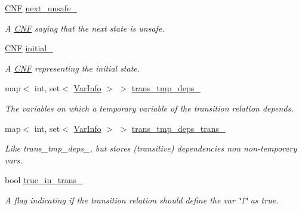 \begin{DoxyCompactItemize}
\hyperlink{classCNF}{C\-N\-F} \hyperlink{classAIG2CNF_a0430b9b4ff38a7b0ae339fb0abd191c9}{next\-\_\-unsafe\-\_\-}
\begin{DoxyCompactList}\small\item\em A \hyperlink{classCNF}{C\-N\-F} saying that the next state is unsafe. \end{DoxyCompactList}\item 
\hyperlink{classCNF}{C\-N\-F} \hyperlink{classAIG2CNF_a83d0b27b61d672ecf2bd007e0d473439}{initial\-\_\-}
\begin{DoxyCompactList}\small\item\em A \hyperlink{classCNF}{C\-N\-F} representing the initial state. \end{DoxyCompactList}\item 
map$<$ int, set$<$ \hyperlink{classVarInfo}{Var\-Info} $>$ $>$ \hyperlink{classAIG2CNF_a8617860055dfa8cbcc1f572676f57b84}{trans\-\_\-tmp\-\_\-deps\-\_\-}
\begin{DoxyCompactList}\small\item\em The variables on which a temporary variable of the transition relation depends. \end{DoxyCompactList}\item 
map$<$ int, set$<$ \hyperlink{classVarInfo}{Var\-Info} $>$ $>$ \hyperlink{classAIG2CNF_a7e3c2e9acc3357e837349e30447b93c3}{trans\-\_\-tmp\-\_\-deps\-\_\-trans\-\_\-}
\begin{DoxyCompactList}\small\item\em Like trans\-\_\-tmp\-\_\-deps\-\_\-, but stores (transitive) dependencies non non-\/temporary vars. \end{DoxyCompactList}\item 
bool \hyperlink{classAIG2CNF_a0a46853e81b9c2be9dc9dab2d080355d}{true\-\_\-in\-\_\-trans\-\_\-}
\begin{DoxyCompactList}\small\item\em A flag indicating if the transition relation should define the var \char`\"{}1\char`\"{} as true. \end{DoxyCompactList}\end{DoxyCompactItemize}
